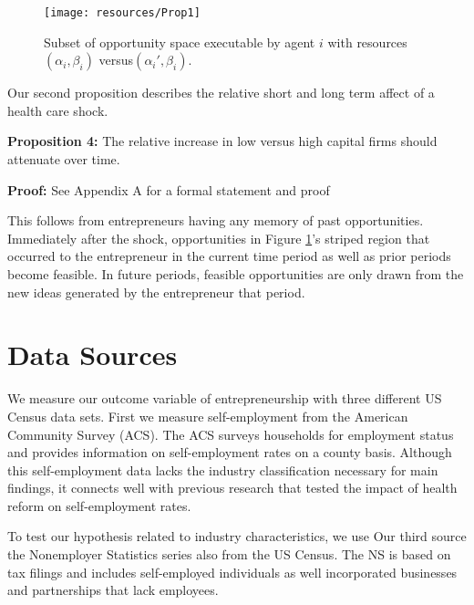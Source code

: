 \documentclass[12pt]{article}
\begin{document}
\begin{figure}[H]
	\centering
	\texttt{[image: resources/Prop1]}
	\caption{Subset of opportunity space executable by agent $i$ with resources $(\alpha_i,\beta_i)$ versus$(\alpha_i', \beta_i)$.}
	\label{fig:ideaSpace}
\end{figure}

Our second proposition describes the relative short and long term affect of a health care shock. 

\textbf{Proposition 4:} The relative increase in low versus high capital firms should attenuate over time. 

\textbf{Proof:} See Appendix A for a formal statement and proof

This follows from entrepreneurs having any memory of past opportunities. Immediately after the shock, opportunities in Figure \ref{fig:ideaSpace}'s striped region that occurred to the entrepreneur in the current time period as well as prior periods become feasible. In future periods, feasible opportunities are only drawn from the new ideas generated by the entrepreneur that period.


\section{Data Sources}
\label{sec:data}


We measure our outcome variable of entrepreneurship with three different US Census data sets. First we measure self-employment from the American Community Survey (ACS). The ACS surveys households for employment status and provides information on self-employment rates on a county basis. Although this self-employment data lacks the industry classification necessary for main findings, it connects well with previous research that tested the impact of health reform on self-employment rates. 

To test our hypothesis related to industry characteristics, we use Our third source the Nonemployer Statistics series also from the US Census. The NS is based on tax filings and includes self-employed individuals as well incorporated businesses and partnerships that lack employees. 
\end{document}
